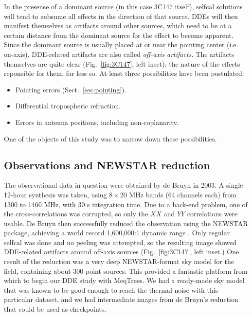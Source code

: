 \documentclass[]{aa}
\begin{document}
In the presense of a dominant source (in this case 3C147 itself), selfcal solutions will tend to subsume all effects in the direction of that source. DDEs will then manifest themselves as artifacts around other sources, which need to be at a certain distance from the dominant source for the effect to become apparent. Since the dominant source is usually placed at or near the pointing center (i.e. on-axis), DDE-related artifacts are also called {\em off-axis artifacts.} The artifacts themselves are quite clear (Fig.~\ref{fig:3C147}, left inset): the nature of the effects reponsible for them, far less so. At least three possibilities have been postulated:

\begin{itemize}
\item Pointing errors (Sect.~\ref{sec:pointing}).
\item Differential tropospheric refraction.
\item Errors in antenna positions, including non-coplanarity.
\end{itemize}

One of the objects of this study was to narrow down these possibilities.

\subsection{Observations and NEWSTAR reduction}

The observational data in question were obtained by de Bruyn in 2003. A single 12-hour synthesis was taken, using $8\times20$ MHz bands (64 channels each) from 1300 to 1460 MHz, with 30 s integration time. Due to a back-end problem, one of the cross-correlations was corrupted, so only the $XX$ and $YY$ correlations were usable. De Bruyn then successfully reduced the observation using the NEWSTAR package, achieving a world record 1,600,000:1 dynamic range \citep{deBruyn:3C147}. Only regular selfcal was done and no peeling was attempted, so the resulting image showed DDE-related artifacts around off-axis sources (Fig.~\ref{fig:3C147}, left inset.) One result of the reduction was a very deep NEWSTAR-format sky model for the field, containing about 300 point sources. This provided a fantastic platform from which to begin our DDE study with MeqTrees. We had a ready-made sky model that was known to be good enough to reach the thermal noise with this particular dataset, and we had intermediate images from de Bruyn's reduction that could be used as checkpoints.
\end{document}
